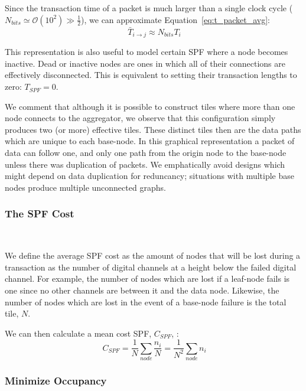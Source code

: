 Since the transaction time of a packet is much larger than a single clock cycle ($N_{bits} \simeq \mathcal{O}(10^{2}) \gg \frac{1}{2}$), we can approximate Equation~\ref{eq:t_packet_avg}:
\begin{equation}~\label{eq:t_packet}
\bar{T}_{i\rightarrow j} \approx N_{bits}T_{i}
\end{equation}

This representation is also useful to model certain SPF where a node becomes inactive.
Dead or inactive nodes are ones in which all of their connections are effectively disconnected.
This is equivalent to setting their transaction lengths to zero: $T_{SPF} = 0$.

We comment that although it is possible to construct tiles where more than one node connects to the aggregator, we observe that this configuration simply produces two (or more) effective tiles.
These distinct tiles then are the data paths which are unique to each base-node.
In this graphical representation a packet of data can follow one, and only one path from the origin node to the base-node unless there was duplication of packets.
We emphatically avoid designs which might depend on data duplication for reduncancy; situations with multiple base nodes produce multiple unconnected graphs.

\subsubsection{The SPF Cost}~\label{sec:spf_cost}

We define the average SPF cost as the amount of nodes that will be lost during a transaction as the number of digital channels at a height below the failed digital channel.
For example, the number of nodes which are lost if a leaf-node fails is one since no other channels are between it and the data node.
Likewise, the number of nodes which are lost in the event of a base-node failure is the total tile, $N$.

We can then calculate a mean cost SPF, $C_{SPF}$, :
\begin{equation}~\label{eq:cspf}
  C_{SPF} = \frac{1}{N}\sum_{node} \frac{n_{i}}{N} = \frac{1}{N^{2}}\sum_{node} n_{i}
\end{equation}

\subsubsection{Minimize Occupancy}~\label{sec:min_conn}

